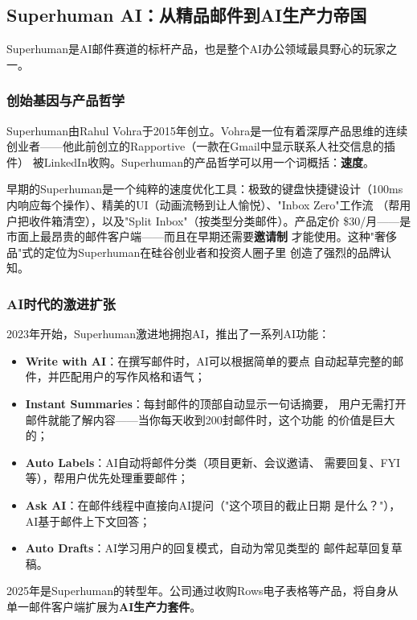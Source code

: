 \subsection{Superhuman AI：从精品邮件到AI生产力帝国}
\label{subsec:superhuman}

Superhuman是AI邮件赛道的标杆产品，也是整个AI办公领域最具野心的玩家之一。

\subsubsection{创始基因与产品哲学}
Superhuman由Rahul Vohra于2015年创立。Vohra是一位有着深厚产品思维的连续
创业者——他此前创立的Rapportive（一款在Gmail中显示联系人社交信息的插件）
被LinkedIn收购。Superhuman的产品哲学可以用一个词概括：\textbf{速度}。

早期的Superhuman是一个纯粹的速度优化工具：极致的键盘快捷键设计（100ms
内响应每个操作）、精美的UI（动画流畅到让人愉悦）、"Inbox Zero"工作流
（帮用户把收件箱清空），以及"Split Inbox"（按类型分类邮件）。产品定价
\$30/月——是市面上最昂贵的邮件客户端——而且在早期还需要\textbf{邀请制}
才能使用。这种"奢侈品"式的定位为Superhuman在硅谷创业者和投资人圈子里
创造了强烈的品牌认知。

\subsubsection{AI时代的激进扩张}
2023年开始，Superhuman激进地拥抱AI，推出了一系列AI功能：

\begin{itemize}
  \item \textbf{Write with AI}：在撰写邮件时，AI可以根据简单的要点
    自动起草完整的邮件，并匹配用户的写作风格和语气；
  \item \textbf{Instant Summaries}：每封邮件的顶部自动显示一句话摘要，
    用户无需打开邮件就能了解内容——当你每天收到200封邮件时，这个功能
    的价值是巨大的；
  \item \textbf{Auto Labels}：AI自动将邮件分类（项目更新、会议邀请、
    需要回复、FYI等），帮用户优先处理重要邮件；
  \item \textbf{Ask AI}：在邮件线程中直接向AI提问（"这个项目的截止日期
    是什么？"），AI基于邮件上下文回答；
  \item \textbf{Auto Drafts}：AI学习用户的回复模式，自动为常见类型的
    邮件起草回复草稿。
\end{itemize}

2025年是Superhuman的转型年。公司通过收购Rows电子表格等产品，将自身从
单一邮件客户端扩展为\textbf{AI生产力套件}。

